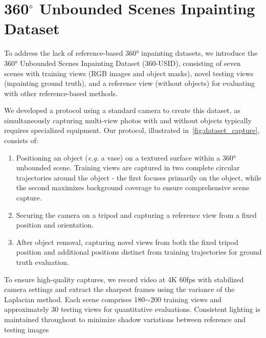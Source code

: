 \section{360$^{\circ}$ Unbounded Scenes Inpainting Dataset}
\label{sec:dataset}
To address the lack of reference-based 360° inpainting datasets, we introduce the 360° Unbounded Scenes Inpainting Dataset (360-USID), consisting of seven scenes with training views (RGB images and object masks), novel testing views (inpainting ground truth), and a reference view (without objects) for evaluating with other reference-based methods.

\vspace{3pt}
We developed a protocol using a standard camera to create this dataset, as simultaneously capturing multi-view photos with and without objects typically requires specialized equipment. Our protocol, illustrated in~\cref{fig:dataset_capture}, consists of:
\begin{enumerate}
\item Positioning an object (\emph{e.g.} a vase) on a textured surface within a 360° unbounded scene. Training views are captured in two complete circular trajectories around the object - the first focuses primarily on the object, while the second maximizes background coverage to ensure comprehensive scene capture.
\item Securing the camera on a tripod and capturing a reference view from a fixed position and orientation.
\item After object removal, capturing novel views from both the fixed tripod position and additional positions distinct from training trajectories for ground truth evaluation.
\end{enumerate}
To ensure high-quality captures, we record video at 4K 60fps with stabilized camera settings and extract the sharpest frames using the variance of the Laplacian method. Each scene comprises 180$\sim$200 training views and approximately 30 testing views for quantitative evaluations. Consistent lighting is maintained throughout to minimize shadow variations between reference and testing images


